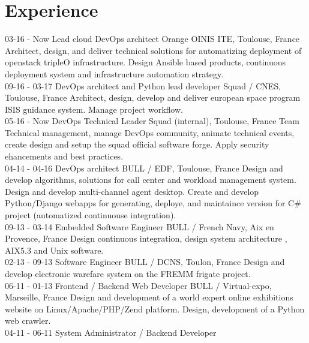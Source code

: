 \documentclass[]{friggeri-cv}
\begin{document}
\newpage
\section{Experience}
\begin{entrylist}
    \entry
        {03-16 - Now}
        {Lead cloud DevOps architect}
        {Orange OINIS ITE, Toulouse, France}
        {Architect, design, and deliver technical solutions for automatizing deployment of openstack tripleO infrastructure. Design Ansible based products, continuous deployment system and infrastructure automation strategy.\\}
    \entry
        {09-16 - 03-17}
        {DevOps architect and Python lead developer}
        {Squad / CNES, Toulouse, France}
        {Architect, design, develop and deliver european space program ISIS guidance system. Manage project workflow.\\}
    \entry
        {05-16 - Now}
        {DevOps Technical Leader}
        {Squad (internal), Toulouse, France}
        {Team Technical management, manage DevOps community, animate technical events, create design and setup the squad official software forge. Apply security ehancements and best practices.\\}
    \entry
        {04-14 - 04-16}
        {DevOps architect}
        {BULL / EDF, Toulouse, France}
        {Design and develop algorithms, solutions for call center and workload management system. Design and develop multi-channel agent desktop.
        Create and develop Python/Django webapps for generating, deploye, and maintaince version for C\# project (automatized continuouse integration).\\}
    \entry
        {09-13 - 03-14}
        {Embedded Software Engineer}
        {BULL / French Navy, Aix en Provence, France}
        {Design continuous integration, design system architecture , AIX5.3 and Unix software.\\}
    \entry
        {02-13 - 09-13}
        {Software Engineer}
        {BULL / DCNS, Toulon, France}
        {Design and develop electronic warefare system on the FREMM frigate project.\\}
    \entry
        {06-11 - 01-13}
        {Frontend / Backend Web Developer}
        {BULL / Virtual-expo, Marseille, France}
        {Design and development of a world expert online exhibitions website on Linux/Apache/PHP/Zend platform. Design, development of a Python web crawler.\\}
    \entry
        {04-11 - 06-11}
        {System Administrator / Backend Developer}

\end{entrylist}
\end{document}
